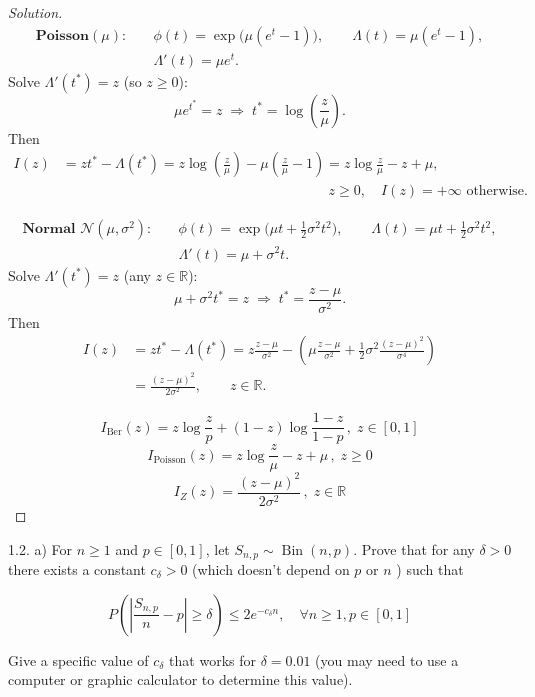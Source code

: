 \begin{proof}[Solution]
\[
\begin{aligned}
\textbf{Poisson}(\mu):\quad
&\phi(t) = \exp\!\big(\mu(e^t-1)\big),\qquad \Lambda(t)=\mu(e^t-1),\\
&\Lambda'(t)=\mu e^t.
\end{aligned}
\]
Solve \(\Lambda'(t^*)=z\) (so \(z\ge 0\)):
\[
\mu e^{t^*}=z \;\Longrightarrow\; t^*=\log\!\left(\frac{z}{\mu}\right).
\]
Then
\[
\begin{aligned}
I(z) &= z t^* - \Lambda(t^*)
= z \log\!\left(\frac{z}{\mu}\right) - \mu\!\left(\frac{z}{\mu}-1\right)
= z \log\!\frac{z}{\mu} - z + \mu,\\
&\hspace{8cm} z\ge 0,\quad I(z)=+\infty \text{ otherwise.}
\end{aligned}
\]

\[
\begin{aligned}
\textbf{Normal } \mathcal N(\mu,\sigma^2):\quad
&\phi(t)=\exp\!\Big(\mu t + \tfrac12 \sigma^2 t^2\Big),\qquad
\Lambda(t)=\mu t + \tfrac12 \sigma^2 t^2,\\
&\Lambda'(t)=\mu + \sigma^2 t.
\end{aligned}
\]
Solve \(\Lambda'(t^*)=z\) (any \(z\in\mathbb R\)):
\[
\mu + \sigma^2 t^* = z \;\Longrightarrow\; t^*=\frac{z-\mu}{\sigma^2}.
\]
Then
\[
\begin{aligned}
I(z) &= z t^* - \Lambda(t^*)
= z\frac{z-\mu}{\sigma^2} - \left(\mu \frac{z-\mu}{\sigma^2} + \frac12 \sigma^2 \frac{(z-\mu)^2}{\sigma^4}\right)\\
&= \frac{(z-\mu)^2}{2\sigma^2},\qquad z\in\mathbb R.
\end{aligned}
\]

\[
\boxed{\,I_{\text{Ber}}(z)= z\log\frac{z}{p} + (1-z)\log\frac{1-z}{1-p}\,,\; z\in[0,1]\,}
\]
\[
\boxed{\,I_{\text{Poisson}}(z)= z\log\frac{z}{\mu} - z + \mu\,,\; z\ge 0\,}
\]
\[
\boxed{\,I_{Z}(z)= \dfrac{(z-\mu)^2}{2\sigma^2}\,,\; z\in\mathbb R\,}
\]
	

\end{proof}


1.2. a) For $n \geq 1$ and $p \in[0,1]$, let $S_{n, p} \sim \operatorname{Bin}(n, p)$. Prove that for any $\delta>0$ there exists a constant $c_\delta>0$ (which doesn't depend on $p$ or $n$ ) such that

\[
P\left(\left|\frac{S_{n, p}}{n}-p\right| \geq \delta\right) \leq 2 e^{-c_\delta n}, \quad \forall n \geq 1, p \in[0,1]
\]


Give a specific value of $c_\delta$ that works for $\delta=0.01$ (you may need to use a computer or graphic calculator to determine this value).

